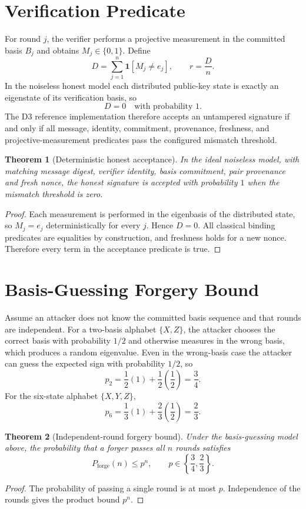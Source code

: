 \documentclass[11pt,a4paper]{article}
\newtheorem{theorem}{Theorem}
\begin{document}
\section{Verification Predicate}
For round $j$, the verifier performs a projective measurement in the committed
basis $B_j$ and obtains $M_j\in\{0,1\}$. Define
\[
D=\sum_{j=1}^n \mathbf 1[M_j\neq e_j],
\qquad r=\frac{D}{n}.
\]
In the noiseless honest model each distributed public-key state is exactly an
eigenstate of its verification basis, so
\[
D=0 \quad\text{with probability }1.
\]
The D3 reference implementation therefore accepts an untampered signature if
and only if all message, identity, commitment, provenance, freshness, and
projective-measurement predicates pass the configured mismatch threshold.

\begin{theorem}[Deterministic honest acceptance]
In the ideal noiseless model, with matching message digest, verifier identity,
basis commitment, pair provenance and fresh nonce, the honest signature is
accepted with probability $1$ when the mismatch threshold is zero.
\end{theorem}
\begin{proof}
Each measurement is performed in the eigenbasis of the distributed state, so
$M_j=e_j$ deterministically for every $j$. Hence $D=0$. All classical binding
predicates are equalities by construction, and freshness holds for a new nonce.
Therefore every term in the acceptance predicate is true.
\end{proof}

\section{Basis-Guessing Forgery Bound}
Assume an attacker does not know the committed basis sequence and that rounds
are independent. For a two-basis alphabet $\{X,Z\}$, the attacker chooses the
correct basis with probability $1/2$ and otherwise measures in the wrong basis,
which produces a random eigenvalue. Even in the wrong-basis case the attacker
can guess the expected sign with probability $1/2$, so
\[
p_2=\frac12(1)+\frac12\left(\frac12\right)=\frac34.
\]
For the six-state alphabet $\{X,Y,Z\}$,
\[
p_6=\frac13(1)+\frac23\left(\frac12\right)=\frac23.
\]

\begin{theorem}[Independent-round forgery bound]
Under the basis-guessing model above, the probability that a forger passes all
$n$ rounds satisfies
\[
P_{\mathrm{forge}}(n)\le p^n,
\qquad p\in\left\{\frac34,\frac23\right\}.
\]
\end{theorem}
\begin{proof}
The probability of passing a single round is at most $p$. Independence of the
rounds gives the product bound $p^n$.
\end{proof}
\end{document}
